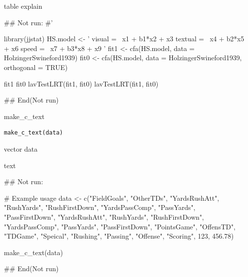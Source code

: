 \documentclass[a4paper]{book}
\begin{document}
%
\begin{Value}
table explain
\end{Value}
%
\begin{Examples}
\begin{ExampleCode}

## Not run: 
#'

library(jjstat)
HS.model <- '
    visual  =~ x1 + b1*x2 + x3
    textual =~ x4 + b2*x5 + x6
    speed   =~ x7 + b3*x8 + x9
'
fit1 <- cfa(HS.model, data = HolzingerSwineford1939)
fit0 <- cfa(HS.model, data = HolzingerSwineford1939,
            orthogonal = TRUE)

fit1 %
fit0 %
lavTestLRT(fit1, fit0)
lavTestLRT(fit1, fit0) %

## End(Not run)


\end{ExampleCode}
\end{Examples}
%
\begin{Description}
make\_c\_text
\end{Description}
%
\begin{Usage}
\begin{verbatim}
make_c_text(data)
\end{verbatim}
\end{Usage}
%
\begin{Arguments}
\begin{ldescription}
\item[\code{data}] vector data
\end{ldescription}
\end{Arguments}
%
\begin{Value}
text
\end{Value}
%
\begin{Examples}
\begin{ExampleCode}


## Not run: 

# Example usage
data <- c("FieldGoals", "OtherTDs", "YardsRushAtt", "RushYards",
          "RushFirstDown", "YardsPassComp", "PassYards", "PassFirstDown",
          "YardsRushAtt", "RushYards", "RushFirstDown", "YardsPassComp",
          "PassYards", "PassFirstDown", "PointsGame", "OffensTD",
          "TDGame", "Speical", "Rushing", "Passing",
          "Offense", "Scoring", 123, 456.78)

make_c_text(data)


## End(Not run)
\end{ExampleCode}
\end{Examples}
\end{document}
